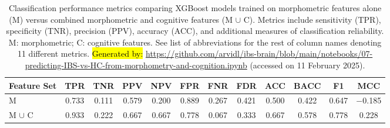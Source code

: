 \documentclass[diagnostics,article,accept,pdftex,moreauthors]{Definitions/mdpi}
\begin{document}
\begin{table}[H]
\centering
\footnotesize
\caption{{{Classification performance metrics comparing XGBoost models trained on morphometric features alone (M) versus combined morphometric and cognitive features} (M $\cup$ C)}. Metrics include sensitivity (TPR), specificity (TNR), precision (PPV), accuracy (ACC), and additional measures of classification reliability. M: morphometric; C: cognitive features. See list of abbreviations for the rest of column names denoting 11 different metrics.
{\hl{Generated by:} {{\url{https://github.com/arvidl/ibs-brain/blob/main/notebooks/07-predicting-IBS-vs-HC-from-morphometry-and-cognition.ipynb}}}} (accessed on 11 February 2025). \label{tab:metrics-compare}}
\begin{tabular}{lccccccccccc}
\toprule
\textbf{Feature Set} & \textbf{TPR} & \textbf{TNR} & \textbf{PPV} & \textbf{NPV} & {\textbf{FPR}} & \textbf{FNR} & \textbf{FDR} & \textbf{ACC} & \textbf{BACC} & \textbf{F1} & \textbf{MCC} \\
\midrule
M & 0.733 & 0.111 & 0.579 & 0.200 & 0.889 & 0.267 & 0.421 & 0.500 & 0.422 & 0.647 & $-$0.185 \\
M $\cup$ C & 0.933 & 0.222 & 0.667 & 0.667 & 0.778 & 0.067 & 0.333 & 0.667 & 0.578 & 0.778 & 0.228 \\
\bottomrule
\end{tabular}





\end{table}


\vspace{-10pt}
\end{document}
